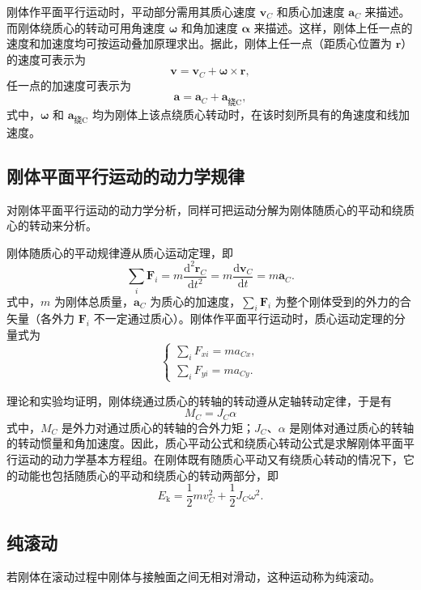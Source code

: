    刚体作平面平行运动时，平动部分需用其质心速度 $\boldsymbol{v}_C$ 和质心加速度 $\boldsymbol{a}_C$ 来描述。而刚体绕质心的转动可用角速度 $\boldsymbol{\omega}$ 和角加速度 $\boldsymbol{\alpha}$ 来描述。这样，刚体上任一点的速度和加速度均可按运动叠加原理求出。据此，刚体上任一点（距质心位置为 $\boldsymbol{r}$）的速度可表示为
    \[
    \boldsymbol{v}=\boldsymbol{v}_C+\boldsymbol{\omega}\times\boldsymbol{r},
    \]
    任一点的加速度可表示为
    \[
    \boldsymbol{a}=\boldsymbol{a}_C+\boldsymbol{a}_\text{绕C},
    \]
    式中，$\boldsymbol{\omega}$ 和 $\boldsymbol{a}_\text{绕C}$ 均为刚体上该点绕质心转动时，在该时刻所具有的角速度和线加速度。

    \subsection{刚体平面平行运动的动力学规律}
    对刚体平面平行运动的动力学分析，同样可把运动分解为刚体随质心的平动和绕质心的转动来分析。

    刚体随质心的平动规律遵从质心运动定理，即
    \[
    \sum_i \boldsymbol{F}_i = m \frac{\mathrm{d}^2 \boldsymbol{r}_C}{\mathrm{d}t^2}=m \frac{\mathrm{d}\boldsymbol{v}_C}{\mathrm{d}t}=m \boldsymbol{a}_C.
    \]
    式中，$m$ 为刚体总质量，$\boldsymbol{a}_C$ 为质心的加速度，$\sum_i \boldsymbol{F}_i$ 为整个刚体受到的外力的合矢量（各外力 $\boldsymbol{F}_i$ 不一定通过质心）。刚体作平面平行运动时，质心运动定理的分量式为
    \[
    \begin{cases}
    \sum_i F_{xi}=m a_{Cx},\\
    \sum_i F_{yi}=m a_{Cy}.
    \end{cases}
    \]

    理论和实验均证明，刚体绕通过质心的转轴的转动遵从定轴转动定律，于是有
    \[
    M_C = J_C \alpha
    \]
    式中，$M_C$ 是外力对通过质心的转轴的合外力矩；$J_C$、$\alpha$ 是刚体对通过质心的转轴的转动惯量和角加速度。因此，质心平动公式和绕质心转动公式是求解刚体平面平行运动的动力学基本方程组。在刚体既有随质心平动又有绕质心转动的情况下，它的动能也包括随质心的平动和绕质心的转动两部分，即
    \[
    E_\mathrm{k}=\frac12 m v_C^2+\frac12 J_C \omega^2.
    \]

    \subsection{纯滚动}
    若刚体在滚动过程中刚体与接触面之间无相对滑动，这种运动称为纯滚动。

